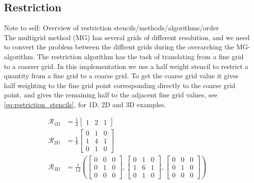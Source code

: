         \subsection{Restriction}
            Note to self: Overview of restriction stencils/methods/algorithms/order\\

            	\label{sec:restr_simple}
            	The multigrid method (MG) has several grids of different resolution, and we need to
             	convert the problem between the diffrent grids during the overarching the MG-algorithm.
             	The restriction algorithm has the task of translating from a fine grid to a coarser grid.
            	In this implementation we use a half weight stencil to restrict a quantity from a fine
            	grid to a coarse grid. To get the coarse grid value it gives half weighting to
            	the fine grid point corresponding directly to the coarse grid point, and gives the remaining
            	half to the adjacent fine grid values, see \eqref{eq:restriction_stencils}, for 1D,
            	2D and 3D examples.

            	\begin{equation}
            		\begin{aligned}
            			\mathcal{R}_{1\text{D}} &= \frac{1}{4}
            			\begin{bmatrix}
            				1 & 2 & 1
            			\end{bmatrix}
            			\\
            			\mathcal{R}_{2\text{D}} &= \frac{1}{8}
            			\begin{bmatrix}
            				0 & 1 & 0
            				\\
            				1 & 4 & 1
            				\\
            				0 & 1 & 0
            			\end{bmatrix}
            			\\
            			\mathcal{R}_{3\text{D}} &= \frac{1}{12} \left(
            			\begin{bmatrix}
            				0 & 0 & 0
            				\\
            				0 & 1 & 0
            				\\
            				0 & 0 & 0
            			\end{bmatrix}
            			,
            			\begin{bmatrix}
            				0 & 1 & 0
            				\\
            				1 & 6 & 1
            				\\
            				0 & 1 & 0
            			\end{bmatrix}
            			,
            			\begin{bmatrix}
            				0 & 0 & 0
            				\\
            				0 & 1 & 0
            				\\
            				0 & 0 & 0
            			\end{bmatrix}
            			\right)
            			\label{eq:restriction_stencils}
            		\end{aligned}
            	\end{equation}

